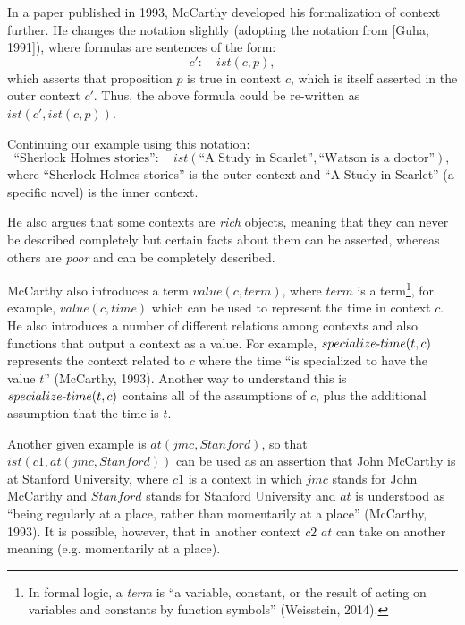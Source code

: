 In a paper published in 1993, McCarthy developed his formalization of context further. He changes the notation slightly (adopting the notation from [Guha, 1991]), where formulas are sentences of the form:
\begin{equation}
  \label{eq:ist1}
 c': \quad	ist(c,p),
\end{equation}
which asserts that proposition $p$ is true in context $c$, which is itself asserted in the outer context $c'$. Thus, the above formula could be re-written as $ist(c', ist(c,p))$. 

Continuing our example using this notation:
\begin{equation}
  \label{eq:context1}
 \text{``Sherlock Holmes stories''}: \quad	ist(\text{``A Study in Scarlet''},\text{``Watson is a doctor''}),
\end{equation}
where ``Sherlock Holmes stories'' is the outer context and ``A Study in Scarlet'' (a specific novel) is the inner context.

He also argues that some contexts are \emph{rich} objects, meaning that they can never be described completely but certain facts about them can be asserted, whereas others are \emph{poor} and can be completely described.

McCarthy also introduces a term $value(c,term)$, where $term$ is a term\footnote{In formal logic, a \emph{term} is ``a variable, constant, or the result of acting on variables and constants by function symbols'' (Weisstein, 2014).}, for example, $value(c,time)$ which can be used to represent the time in context $c$. He also introduces a number of different relations among contexts and also functions that output a context as a value. For example, $specialize\textnormal{-}time(t, c)$ represents the context related to $c$ where the time ``is specialized to have the value $t$'' (McCarthy, 1993). Another way to understand this is $specialize\textnormal{-}time(t, c)$ contains all of the assumptions of $c$, plus the additional assumption that the time is $t$.

Another given example is $at(jmc, Stanford)$, so that $ist(c1, at(jmc, Stanford))$ can be used as an assertion that John McCarthy  is at Stanford University, where $c1$ is a context in which $jmc$ stands for John McCarthy and $Stanford$ stands for Stanford University and $at$ is understood as ``being regularly at a place, rather than momentarily at a place'' (McCarthy, 1993). It is possible, however, that in another context $c2$ $at$ can take on another meaning (e.g. momentarily at a place).

